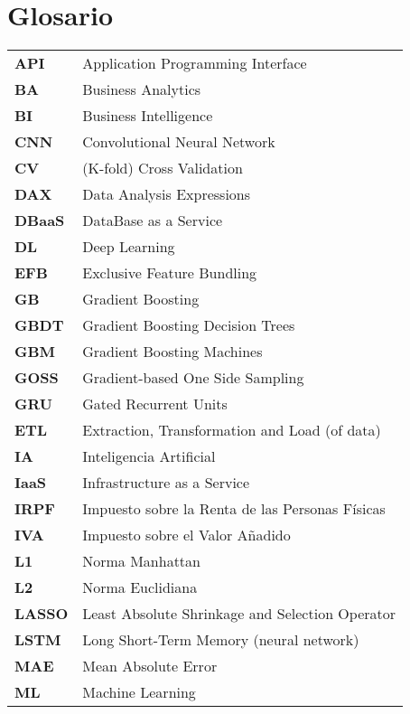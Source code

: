 \newpage

\thispagestyle{fancy}

\section*{Glosario}
\begin{longtable}{l p{13.7cm}}
	\textbf{API}   &  Application Programming Interface \\
	\textbf{BA}   &  Business Analytics \\
	\textbf{BI}   &  Business Intelligence  \\
	\textbf{CNN}  &  Convolutional Neural Network  \\
	\textbf{CV}  &   (K-fold) Cross Validation  \\
	\textbf{DAX}  &  Data Analysis Expressions  \\
	\textbf{DBaaS} &  DataBase as a Service  \\
	\textbf{DL}   &  Deep Learning  \\
	\textbf{EFB}  &  Exclusive Feature Bundling  \\
	\textbf{GB}   &  Gradient Boosting  \\
	\textbf{GBDT} &  Gradient Boosting Decision Trees  \\
	\textbf{GBM}  &  Gradient Boosting Machines  \\
	\textbf{GOSS} &  Gradient-based One Side Sampling  \\
	\textbf{GRU}  &  Gated Recurrent Units  \\
	\textbf{ETL}  &  Extraction, Transformation and Load (of data)  \\
	\textbf{IA}   &  Inteligencia Artificial  \\
	\textbf{IaaS} &  Infrastructure as a Service  \\
	\textbf{IRPF} &  Impuesto sobre la Renta de las Personas Físicas  \\
	\textbf{IVA}  &  Impuesto sobre el Valor Añadido  \\
	\textbf{L1}   &  Norma Manhattan  \\
	\textbf{L2}   &  Norma Euclidiana  \\
	\textbf{LASSO} &  Least Absolute Shrinkage and Selection Operator  \\
	\textbf{LSTM} &  Long Short-Term Memory (neural network)  \\
	\textbf{MAE}  &  Mean Absolute Error  \\
	\textbf{ML}   &  Machine Learning  \\

\end{longtable}
